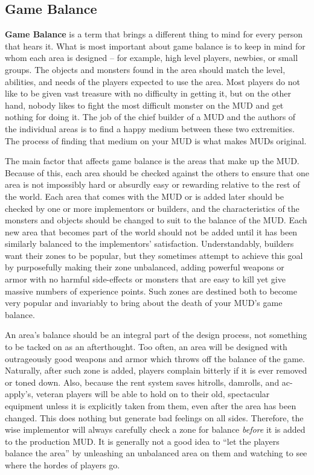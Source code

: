 \documentclass[11pt]{article}
\begin{document}
\subsection{Game Balance}
{\bf Game Balance} is a term that brings a different thing to mind for every person that hears it.  What is most important about game balance is to keep in mind for whom each area is designed -- for example, high level players, newbies, or small groups.  The objects and monsters found
in the area should match the level, abilities, and needs of the players expected to use the area.  Most players do not like to be given vast treasure with no difficulty in getting it, but on the other hand, nobody likes to fight the most difficult monster on the MUD and get nothing for doing it.  The job of the chief builder of a MUD and the authors of the individual areas is to find a happy medium between these two extremities.  The process of finding that medium on your MUD is what makes MUDs original. 
\par
The main factor that affects game balance is the areas that make up the MUD.  Because of this, each area should be checked against the others to ensure that one area is not impossibly hard or absurdly easy or rewarding relative to the rest of the world.  Each area that comes with the MUD or
is added later should be checked by one or more implementors or builders, and the characteristics of the monsters and objects should be changed to suit to the balance of the MUD. Each new area that becomes part of the world should not be added until it has been similarly balanced to the implementors' satisfaction. Understandably, builders want their zones to be popular, but they sometimes attempt to achieve this goal by purposefully making their zone unbalanced, adding powerful weapons or armor with no harmful side-effects or monsters that are easy to kill yet give massive numbers of experience points. Such zones are destined both to become very popular and invariably to bring about the death of your MUD's game balance. 
\par
An area's balance should be an integral part of the design process, not something to be tacked on as an afterthought.  Too often, an area will be designed with outrageously good weapons and armor which throws off the balance of the game.  Naturally, after such zone is added, players complain bitterly if it is ever removed or toned down. Also, because the rent system saves hitrolls, damrolls, and ac-apply's, veteran players will be able to hold on to their old, spectacular equipment unless it is explicitly taken from them, even after the area has been changed. This does nothing but generate bad feelings on all sides. Therefore, the wise implementor will always carefully check a zone for balance {\em before} it is added to the production MUD. It is generally not a good idea to ``let the players balance the area'' by unleashing an unbalanced area on them and watching to see where the hordes of players go. 
\end{document}
